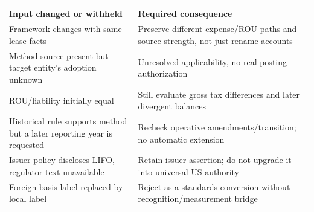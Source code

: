 \begin{longtable}[]{@{}ll@{}}
\toprule
\begin{minipage}[b]{0.47\columnwidth}\raggedright
Input changed or withheld\strut
\end{minipage} & \begin{minipage}[b]{0.47\columnwidth}\raggedright
Required consequence\strut
\end{minipage}\tabularnewline
\midrule
\endhead
\begin{minipage}[t]{0.47\columnwidth}\raggedright
Framework changes with same lease facts\strut
\end{minipage} & \begin{minipage}[t]{0.47\columnwidth}\raggedright
Preserve different expense/ROU paths and source strength, not just rename accounts\strut
\end{minipage}\tabularnewline
\begin{minipage}[t]{0.47\columnwidth}\raggedright
Method source present but target entity's adoption unknown\strut
\end{minipage} & \begin{minipage}[t]{0.47\columnwidth}\raggedright
Unresolved applicability, no real posting authorization\strut
\end{minipage}\tabularnewline
\begin{minipage}[t]{0.47\columnwidth}\raggedright
ROU/liability initially equal\strut
\end{minipage} & \begin{minipage}[t]{0.47\columnwidth}\raggedright
Still evaluate gross tax differences and later divergent balances\strut
\end{minipage}\tabularnewline
\begin{minipage}[t]{0.47\columnwidth}\raggedright
Historical rule supports method but a later reporting year is requested\strut
\end{minipage} & \begin{minipage}[t]{0.47\columnwidth}\raggedright
Recheck operative amendments/transition; no automatic extension\strut
\end{minipage}\tabularnewline
\begin{minipage}[t]{0.47\columnwidth}\raggedright
Issuer policy discloses LIFO, regulator text unavailable\strut
\end{minipage} & \begin{minipage}[t]{0.47\columnwidth}\raggedright
Retain issuer assertion; do not upgrade it into universal US authority\strut
\end{minipage}\tabularnewline
\begin{minipage}[t]{0.47\columnwidth}\raggedright
Foreign basis label replaced by local label\strut
\end{minipage} & \begin{minipage}[t]{0.47\columnwidth}\raggedright
Reject as a standards conversion without recognition/measurement bridge\strut
\end{minipage}\tabularnewline
\bottomrule
\end{longtable}

